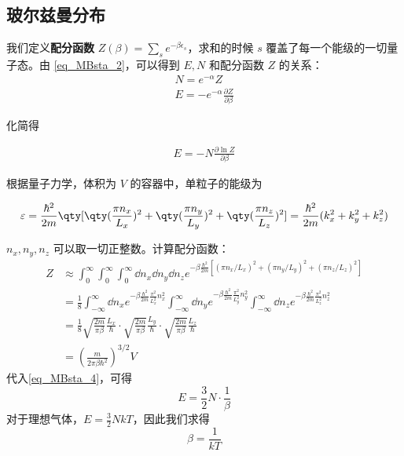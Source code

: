 \subsection{玻尔兹曼分布}
我们定义\textbf{配分函数} $Z(\beta)=\sum_s e^{-\beta \epsilon_s}$，求和的时候 $s$ 覆盖了每一个能级的一切量子态。由 \autoref{eq_MBsta_2}，可以得到 $E,N$ 和配分函数 $Z$ 的关系：
\begin{equation}\label{eq_MBsta_3}
\begin{aligned}
N=e^{-\alpha}Z\\
E=-e^{-\alpha}\frac{\partial Z}{\partial \beta}
\end{aligned}
\end{equation}

化简得

\begin{equation}\label{eq_MBsta_4}
\begin{aligned}
E=-N\frac{\partial \ln Z}{\partial \beta}
\end{aligned}
\end{equation}

根据量子力学，体积为 $V$ 的容器中，单粒子的能级为

\begin{equation}
\varepsilon = \frac{\hbar ^2}{2m} \qty[\qty(\frac{\pi n_x}{L_x})^2 + \qty(\frac{\pi n_y}{L_y})^2 + \qty(\frac{\pi n_z}{L_z})^2] = \frac{\hbar ^2}{2m} (k_x^2 + k_y^2 + k_z^2)
\end{equation}

$n_x,n_y,n_z$ 可以取一切正整数。计算配分函数：
\begin{equation}
\begin{aligned}
Z&\approx \int_{0}^\infty\int_{0}^\infty\int_{0}^\infty\dd n_x\dd n_y\dd n_z  e^{-\beta \frac{\hbar^2}{2m}[(\pi n_x/L_x)^2+(\pi n_y/L_y)^2+(\pi n_z/L_z)^2]}\\
&=\frac{1}{8}\int_{-\infty}^{\infty}\dd n_x e^{-\beta \frac{\hbar^2}{2m}\frac{\pi^2}{L_x^2}n_x^2}\int_{-\infty}^{\infty}\dd n_y e^{-\beta \frac{\hbar^2}{2m}\frac{\pi^2}{L_y^2}n_y^2}\int_{-\infty}^{\infty}\dd n_z e^{-\beta \frac{\hbar^2}{2m}\frac{\pi^2}{L_z^2}n_z^2}
\\
&=\frac{1}{8}\sqrt{\frac{2m}{\pi\beta}}\frac{L_x}{\hbar}\cdot \sqrt{\frac{2m}{\pi\beta}}\frac{L_y}{\hbar} \cdot \sqrt{\frac{2m}{\pi\beta}}\frac{L_z}{\hbar}
\\
&=\left(\frac{m}{2\pi\beta\hbar^2}\right)^{3/2}V
\end{aligned}
\end{equation}
代入\autoref{eq_MBsta_4}，可得
\begin{equation}
E=\frac{3}{2}N\cdot \frac{1}{\beta}
\end{equation}
对于理想气体，$E=\frac{3}{2}N k T$，因此我们求得
\begin{equation}
\beta=\frac{1}{kT}
\end{equation}

